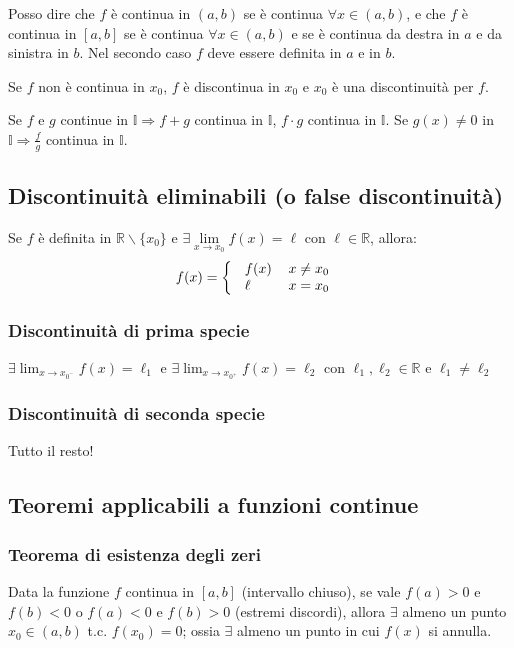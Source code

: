 \documentclass[12pt,a4paper]{article}
\begin{document}
Posso dire che $f$ \`e continua in $(a,b)$ se \`e continua $\forall x 
\in (a,b)$, e che $f$ \`e continua in $[a,b]$ se \`e continua $\forall x 
\in (a,b)$ e se \`e continua da destra in $a$ e da sinistra in $b$. 
Nel secondo caso $f$ deve essere definita in $a$ e in $b$.

Se $f$ non \`e continua in $x_0$, $f$ \`e discontinua in $x_0$ e $x_0$ 
\`e una discontinuit\`a per $f$.

Se $f$ e $g$ continue in $ \mathbb{I} \Rightarrow f+g $ continua 
in $ \mathbb{I} $, $ f \cdot g $ continua in $ \mathbb{I} $.
Se $ g(x) \neq 0 $ in $ \mathbb{I} \Rightarrow \frac{f}{g} $ 
continua in $ \mathbb{I} $.

\subsection{Discontinuit\`a eliminabili (o false discontinuit\`a)}
Se $f$ \`e definita in $\mathbb{R} \backslash \{x_0\}$ e $\exists \lim 
\limits_{x \to x_0} f(x) = \ell$ con $\ell \in \mathbb{R}$, allora:
$$f(x) = \left\{ \text{
\begin{tabular}{l r}
$f(x)$ & $x \neq x_0$ \\
$\ell$ & $x = x_0$ \\
\end{tabular} }
\right. $$

\subsubsection{Discontinuit\`a di prima specie}
$ \exists \lim_{x \to x_{0^-}} f(x) = \ell_1 $ e 
$ \exists \lim_{x \to x_{0^+}} f(x) = \ell_2 $ con 
$ \ell_1, \ell_2 \in \mathbb{R} $ e $ \ell_1 \neq \ell_2 $ 

\subsubsection{Discontinuit\`a di seconda specie}
Tutto il resto!

\subsection{Teoremi applicabili a funzioni continue}

\subsubsection{Teorema di esistenza degli zeri}
Data la funzione $f$ continua in $[a,b]$ (intervallo chiuso), se vale
$f(a) > 0$ e $f(b) < 0$ o $f(a) < 0$ e $f(b) > 0$ (estremi discordi),
allora $\exists$ almeno un punto $x_0 \in (a,b)$ t.c. $f(x_0) = 0$;
ossia $\exists$ almeno un punto in cui $f(x)$ si annulla.
\end{document}
